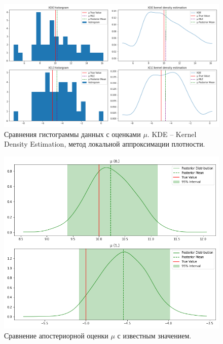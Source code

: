 \documentclass[a4paper,14pt]{extreport}
\begin{document}
\begin{figure}[H]
	\includegraphics[width=\linewidth]{img/gen/pp_mvn_mu_comparison.png}
	\caption{Сравнения гистограммы данных с оценками $\mu$. KDE -- Kernel Density Estimation, метод локальной аппроксимации плотности. }
	\label{fig:pp_mvn_mu_comparison}
\end{figure}

\begin{figure}[H]
	\includegraphics[width=\linewidth]{img/gen/pp_mvn_mu_hdi.png}
	\caption{Сравнение апостериорной оценки $\mu$ с известным значением. }
	\label{fig:pp_mvn_mu_hdi}
\end{figure}
\end{document}
